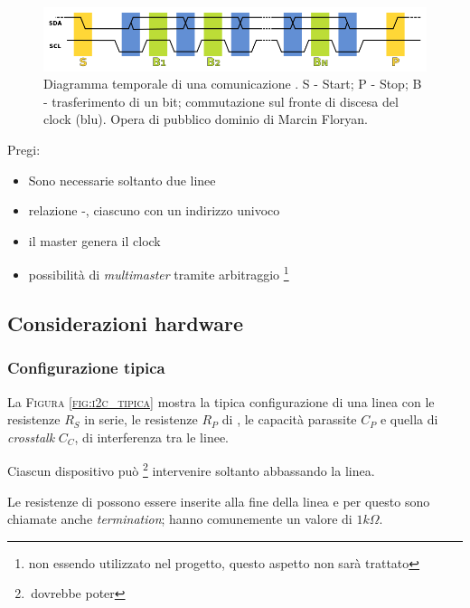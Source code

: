 \begin{figure}[t]
	\centering
	\includegraphics[scale=.3]{I2C_data_transfer}
    \caption{Diagramma temporale di una comunicazione \iic{}. S - Start; P - Stop; B - trasferimento di un bit; commutazione sul fronte di discesa del clock (blu). Opera di pubblico dominio di Marcin Floryan.}
    \label{fig:i2c_trans}
\end{figure}


    Pregi:
\begin{itemize}
	\item {Sono necessarie soltanto due linee}
	\item {relazione {\master}-{\slave}, ciascuno con un indirizzo univoco}
	\item {il master genera il clock}
	\item {
    	possibilità di \textit{multimaster} tramite arbitraggio
   		\footnote {
        	non essendo utilizzato nel progetto,
        	questo aspetto non sarà trattato
        }
	}
\end{itemize}

\subsection{Considerazioni hardware}

\subsubsection{Configurazione tipica}
La \textsc{Figura \ref{fig:i2c_tipica}}
mostra la tipica configurazione di una linea {\iic}
con le resistenze $R_S$ in serie,
le resistenze $R_P$ di \pullup,
le capacità parassite $C_P$
e quella di \textit{crosstalk} $C_C$, di interferenza tra le linee.

Ciascun dispositivo può \footnote{\,dovrebbe poter}
intervenire soltanto abbassando la linea.

Le resistenze di {\pullup} possono essere inserite alla fine della linea
e per questo sono chiamate anche \textit{{\iic} termination};
hanno comunemente un valore di $1k\Omega$.

